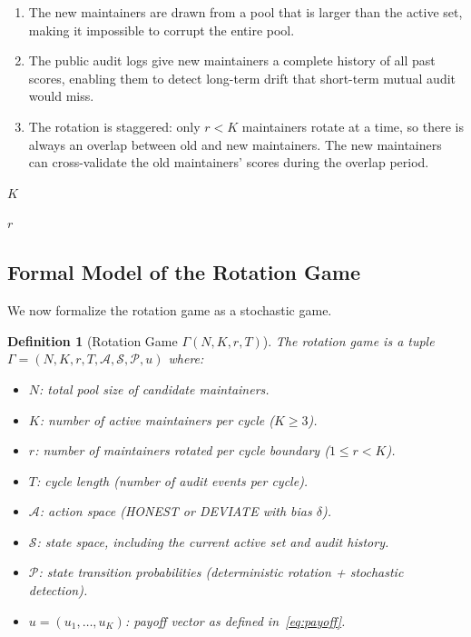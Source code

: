 \documentclass[12pt,a4paper]{article}
\newtheorem{definition}[theorem]{Definition}
\theoremstyle{remark}
\begin{document}
\begin{enumerate}[label=(\arabic*), leftmargin=*]
    \item The new maintainers are drawn from a pool that is larger than the
          active set, making it impossible to corrupt the entire pool.
    \item The public audit logs give new maintainers a complete history of all
          past scores, enabling them to detect long-term drift that short-term
          mutual audit would miss.
    \item The rotation is staggered: only $r < K$ maintainers rotate at a time,
          so there is always an overlap between old and new maintainers. The
          new maintainers can cross-validate the old maintainers' scores during
          the overlap period.
\end{enumerate}

\noindent\textbf{}
$K$



$r$


\subsection{Formal Model of the Rotation Game}

We now formalize the rotation game as a stochastic game.

\begin{definition}[Rotation Game $\Gamma(N, K, r, T)$]
The rotation game is a tuple $\Gamma = (N, K, r, T, \mathcal{A}, \mathcal{S}, \mathcal{P}, u)$ where:
\begin{itemize}[leftmargin=*]
    \item $N$: total pool size of candidate maintainers.
    \item $K$: number of active maintainers per cycle ($K \geq 3$).
    \item $r$: number of maintainers rotated per cycle boundary ($1 \leq r < K$).
    \item $T$: cycle length (number of audit events per cycle).
    \item $\mathcal{A}$: action space (HONEST or DEVIATE with bias $\delta$).
    \item $\mathcal{S}$: state space, including the current active set and audit history.
    \item $\mathcal{P}$: state transition probabilities (deterministic rotation + stochastic detection).
    \item $u = (u_1, \ldots, u_K)$: payoff vector as defined in~\eqref{eq:payoff}.
\end{itemize}
\end{definition}
\end{document}
